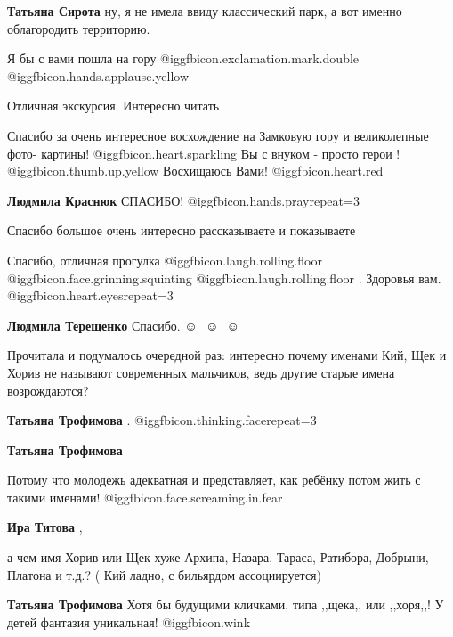 \begin{itemize}
\begin{itemize}
\textbf{Татьяна Сирота} ну, я не имела ввиду классический парк, а вот именно
облагородить территорию.
\end{itemize} %

Я бы с вами пошла на гору @igg{fbicon.exclamation.mark.double} @igg{fbicon.hands.applause.yellow} 

Отличная экскурсия. Интересно читать


Спасибо за очень интересное восхождение на Замковую гору и великолепные фото-
картины!  @igg{fbicon.heart.sparkling} Вы с внуком - просто герои ! @igg{fbicon.thumb.up.yellow} Восхищаюсь Вами! @igg{fbicon.heart.red}

\textbf{Людмила Краснюк} СПАСИБО! @igg{fbicon.hands.pray}{repeat=3} 

Спасибо большое очень интересно рассказываете и показываете

Спасибо, отличная прогулка @igg{fbicon.laugh.rolling.floor}  @igg{fbicon.face.grinning.squinting}  @igg{fbicon.laugh.rolling.floor} . Здоровья вам. @igg{fbicon.heart.eyes}{repeat=3} 

\textbf{Людмила Терещенко} Спасибо. ☺ ️  ☺ ️  ☺ ️ 


Прочитала и подумалось очередной раз: интересно почему именами Кий, Щек и Хорив
не называют современных мальчиков, ведь другие старые имена возрождаются?

\begin{itemize} %
\textbf{Татьяна Трофимова} . @igg{fbicon.thinking.face}{repeat=3} 

\textbf{Татьяна Трофимова} 

Потому что молодежь адекватная и представляет, как ребёнку потом жить с такими
именами! @igg{fbicon.face.screaming.in.fear} 

\textbf{Ира Титова} , 

а чем имя Хорив или Щек хуже Архипа, Назара, Тараса, Ратибора, Добрыни, Платона
и т.д.? ( Кий ладно, с бильярдом ассоциируется)

\textbf{Татьяна Трофимова} Хотя бы будущими кличками, типа ,,щека,, или ,,хоря,,! У детей фантазия уникальная! @igg{fbicon.wink} 
\end{itemize} %


\end{itemize}
